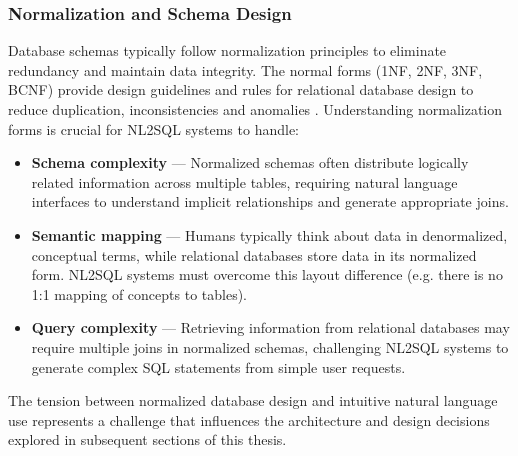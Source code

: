 \subsubsection{Normalization and Schema Design}

Database schemas typically follow normalization principles to eliminate
redundancy and maintain data integrity. The normal forms (1NF, 2NF, 3NF, BCNF)
provide design guidelines and rules for relational database design to reduce
duplication, inconsistencies and anomalies \citep{DatabaseSystemIntro}.
Understanding normalization forms is crucial for NL2SQL systems to handle:

\begin{itemize}
    \item \textbf{Schema complexity} — Normalized schemas often distribute
        logically related information across multiple tables, requiring natural
        language interfaces to understand implicit relationships and generate
        appropriate joins.
    \item \textbf{Semantic mapping} — Humans typically think about data in
        denormalized, conceptual terms, while relational databases store data
        in its normalized form. NL2SQL systems must overcome this layout
        difference (e.g. there is no 1:1 mapping of concepts to tables).
    \item \textbf{Query complexity} — Retrieving information from relational
        databases may require multiple joins in normalized schemas, challenging
        NL2SQL systems to generate complex SQL statements from simple user
        requests.
\end{itemize}

The tension between normalized database design and intuitive natural language
use represents a challenge that influences the architecture and design
decisions explored in subsequent sections of this thesis.
